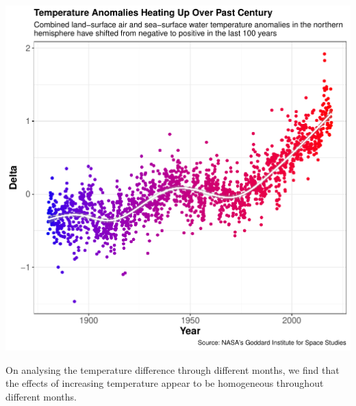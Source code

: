 \documentclass[
]{article}
\begin{document}
\begin{center}\includegraphics{blog1_files/figure-latex/scatter_plot-1} \end{center}

On analysing the temperature difference through different months, we
find that the effects of increasing temperature appear to be homogeneous
throughout different months.
\end{document}
